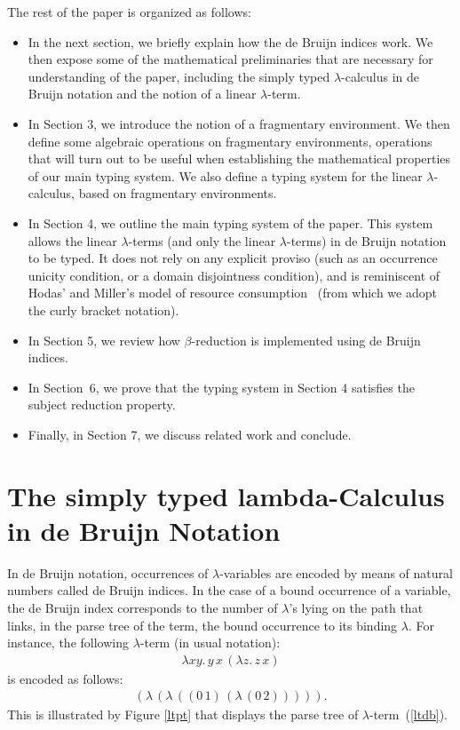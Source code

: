 \documentclass[submission,creativecommons]{eptcs}
\newcommand{\iabs}[1]{(\lambda\,#1)}
\newcommand{\iapp}[2]{(#1\,#2)}
\begin{document}
The rest of the paper is organized as follows:
\begin{itemize}
\item In the next section, we briefly explain how the de Bruijn indices work.
  We then expose some of the mathematical preliminaries that are necessary for understanding of the paper,
  including the simply typed $\lambda$-calculus in de Bruijn notation and the notion of a linear
  $\lambda$-term.
\item In Section 3, we introduce the notion of a fragmentary environment. We then define some algebraic
  operations on fragmentary environments, operations that will turn out to be useful when establishing the
  mathematical properties of our main typing system. We also define a typing system for the linear $\lambda$-calculus, based
  on fragmentary environments. 
\item In Section 4, we outline the main typing system of the paper. This system allows the linear $\lambda$-terms
  (and only the linear $\lambda$-terms) in de Bruijn notation to be typed. It does not rely on any explicit
  proviso (such as an occurrence unicity condition, or a domain disjointness condition), and is reminiscent
  of Hodas' and Miller's model of resource consumption~\cite{Hodas-Miller} (from which we adopt the curly bracket notation).
\item In Section 5, we review how $\beta$-reduction is implemented using de Bruijn indices.
\item In Section~6, we prove that the typing system in Section 4 satisfies the subject reduction property.
\item Finally, in Section 7, we discuss related work and conclude.
\end{itemize}


\section{The simply typed lambda-Calculus in de Bruijn Notation}

In de Bruijn notation, occurrences of $\lambda$-variables are encoded by means of natural numbers called
de Bruijn indices.
In the case of a bound occurrence of a variable, the de Bruijn index corresponds to the number of $\lambda$'s
lying on the path that links, in the parse tree of the term, the bound occurrence to its binding $\lambda$.
For instance, the following $\lambda$-term (in usual notation):
\begin{align}\label{ltusual}
\lambda x y. \, y\,x\,(\lambda z.\,z\,x)
\end{align}
is encoded as follows:
\begin{align}\label{ltdb}
\iabs{\iabs{\iapp{\iapp{0}{1}}{\iabs{\iapp{0}{2}}}}}.
\end{align}
This is illustrated by Figure \ref{ltpt} that displays the parse tree of $\lambda$-term~(\ref{ltdb}).
\end{document}
